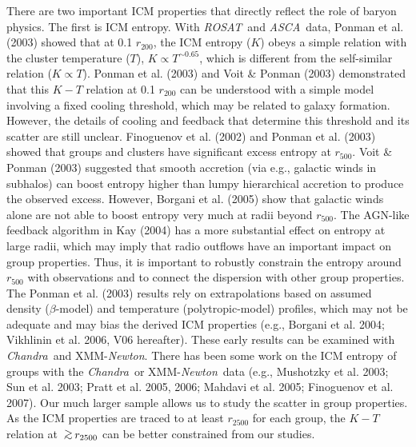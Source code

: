 \documentclass{aastex}
\newcommand{\gsim}{\mbox{\hspace{.2em}\raisebox{.5ex}{$>$}\hspace{-.8em}\raisebox{-.5ex}{$\sim$}\hspace{.2em}}}
\def\asca       {{\em ASCA}\/}
\def\chandra    {{\em Chandra}\/}
\def\xmm        {XMM-{\em Newton}\/}
\def\rosat      {{\em ROSAT}\/}
\begin{document}
There are two important ICM properties that directly reflect the role of baryon physics.
The first is ICM entropy.
With \rosat\ and \asca\ data, Ponman et al. (2003) showed that at 0.1 $r_{200}$,
the ICM entropy ($K$) obeys a simple relation with the cluster temperature ($T$),
$K \propto T^{\sim 0.65}$, which is different from the self-similar
relation ($K \propto T$). Ponman et al. (2003) and Voit \& Ponman (2003) demonstrated
that this $K - T$ relation at 0.1 $r_{200}$ can be understood with a simple model
involving a fixed cooling threshold, which may be related to galaxy formation.
However, the details of cooling and feedback that determine this threshold and its scatter
are still unclear. Finoguenov et al. (2002) and Ponman et al. (2003) showed that groups and 
clusters have significant excess entropy at $r_{500}$. Voit \& Ponman (2003) suggested
that smooth accretion (via e.g., galactic winds in subhalos) can boost entropy
higher than lumpy hierarchical accretion to produce the observed excess. However,
Borgani et al. (2005) show that galactic winds alone are not able to boost
entropy very much at radii beyond $r_{500}$. The AGN-like feedback algorithm in
Kay (2004) has a more substantial effect on entropy at large radii, which may
imply that radio outflows have an important impact on group properties.
Thus, it is important to robustly constrain the entropy around $r_{500}$ with
observations and to connect the dispersion with other group properties. The
Ponman et al. (2003) results rely on extrapolations based on assumed density
($\beta$-model) and temperature (polytropic-model) profiles, which may not be
adequate and may bias the derived ICM properties (e.g., Borgani et al. 2004; Vikhlinin
et al. 2006, V06 hereafter). These early results can be examined with \chandra\
and \xmm. There has been some work on the ICM entropy of groups with the \chandra\
or \xmm\ data (e.g., Mushotzky et al. 2003; Sun et al. 2003; Pratt et al. 2005,
2006; Mahdavi et al. 2005; Finoguenov et al. 2007). Our much larger sample allows
us to study the scatter in group properties. As the ICM properties are traced to at least
$r_{2500}$ for each group, the $K - T$ relation at $\gsim r_{2500}$ can be better
constrained from our studies.
\end{document}
